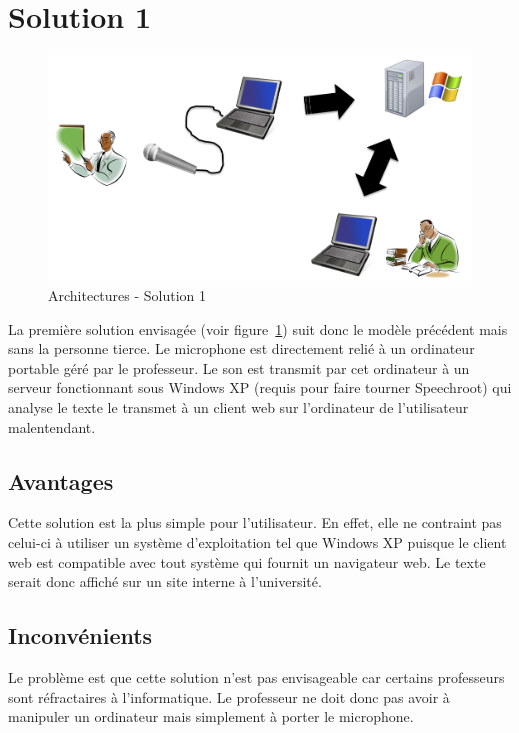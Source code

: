 \section{Solution 1}


\begin{figure}[h]
 \centering
 \includegraphics[scale=0.5]{./images/solution1.png}
 \caption{Architectures - Solution 1}
 \label{fig:solution1}
\end{figure}



La première solution envisagée (voir figure~\ref{fig:solution1}) suit donc le modèle précédent mais sans la personne tierce.
Le microphone est directement relié à un ordinateur portable géré par le professeur.
Le son est transmit par cet ordinateur à un serveur fonctionnant sous Windows XP (requis pour faire tourner Speechroot) qui analyse le texte le transmet à un client web sur l'ordinateur de l'utilisateur malentendant.

\subsection{Avantages}
Cette solution est la plus simple pour l'utilisateur. En effet, elle ne contraint pas celui-ci à utiliser un système d'exploitation tel que Windows XP puisque le client web est compatible avec tout système qui fournit un navigateur web. Le texte serait donc affiché sur un site interne à l'université.

\subsection{Inconvénients}
Le problème est que cette solution n'est pas envisageable car certains professeurs sont ré\-frac\-tai\-res à l'informatique. Le professeur ne doit donc pas avoir à manipuler un ordinateur mais simplement à porter le microphone.


